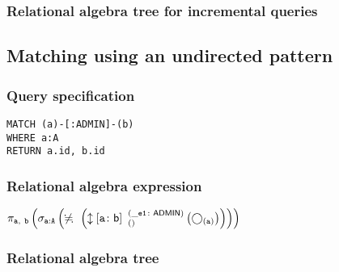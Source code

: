\subsubsection*{Relational algebra tree for incremental queries}


\subsection{Matching using an undirected pattern}

\subsubsection*{Query specification}

\begin{lstlisting}
MATCH (a)-[:ADMIN]-(b)
WHERE a:A
RETURN a.id, b.id
\end{lstlisting}

\subsubsection*{Relational algebra expression}

$\projection{\var{a},~\var{b}} \left(\selection{\mathtt{a:A}} \left(\alldifferent{} \left(\expandboth{a}{b}{}{\_e1}{ADMIN} \left(\getvertices{a}{}\right)\right)\right)\right)$

\subsubsection*{Relational algebra tree}

